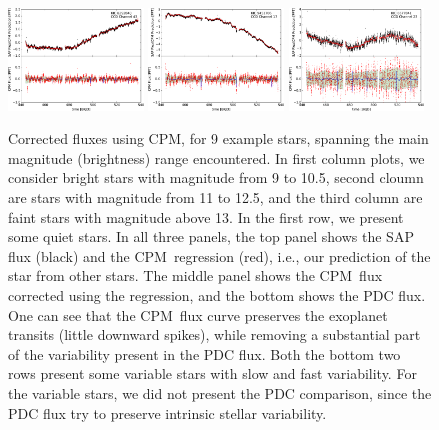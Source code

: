 \documentclass[12pt, preprint]{aastex}
\newcommand{\name}{CPM}
\begin{document}
\begin{figure}[p]
\begin{center}
\includegraphics[width=0.32\textwidth]{f5j}
\hfill
\includegraphics[width=0.32\textwidth]{f5k}
\hfill
\includegraphics[width=0.32\textwidth]{f5l}
\end{center}

\caption{
  \label{fluxes} 
  Corrected fluxes using \name, for 9 example stars, 
    spanning the main magnitude (brightness) range encountered. 
  In first column plots, we consider bright stars with magnitude from 9 to 10.5, 
    second cloumn are stars with magnitude from 11 to 12.5,  
    and the third column are faint stars with magnitude above 13. 
  In the first row, we present some quiet stars. 
  In all three panels, the top panel shows the SAP flux (black) and the \name\ regression (red), 
    i.e., our prediction of the star from other stars. 
  The middle panel shows the \name\ flux corrected using the regression, and the bottom shows the PDC flux. 
  One can see that the \name\ flux curve preserves the exoplanet transits (little downward spikes), 
    while removing a substantial part of the variability present in the PDC flux. 
  Both the bottom two rows present some variable stars with slow and fast variability. 
  For the variable stars, we did not present the PDC comparison, 
    since the PDC flux try to preserve intrinsic stellar variability.}
\end{figure}
\end{document}

